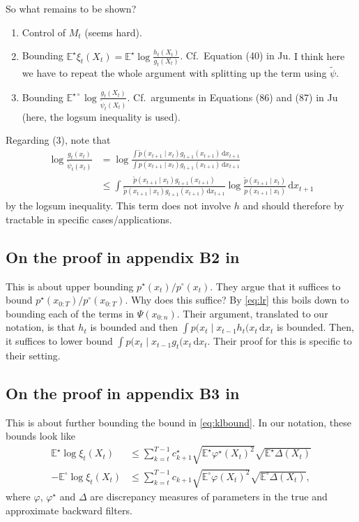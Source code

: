 \documentclass[11pt,reqno]{amsart}
\newcommand{\dd}{{\,\mathrm d}}
\renewcommand{\phi}{\varphi}
\newcommand{\EE}{\mathbb{E}}
\theoremstyle{definition}
\newcommand{\note}[1]{{\color{Red} #1}}
\begin{document}
So what remains to be shown?
\begin{enumerate}
	\item Control of $M_t$ (seems hard).
	\item Bounding $\EE^\star \xi_t(X_t) = \EE^\star \log \frac{h_t(X_t)}{g_t(X_t)}$. Cf.\ Equation (40) in Ju. \note{I think here we have to repeat the whole argument with splitting up the term using $\tilde\psi$.}
	\item Bounding $\EE^{\star\circ} \log \frac{g_t(X_t)}{\tilde\psi_t(X_t)}$. Cf.\ arguments in Equations (86) and (87) in Ju (here, the logsum inequality is used).
\end{enumerate}

Regarding (3), note that
\begin{align*}
	\log \frac{g_t(x_t)}{\tilde\psi_t(x_t)} & = \log \frac{\int \tilde p(x_{t+1}\mid x_t) g_{t+1}(x_{t+1}) \dd x_{t+1}}{\int p(x_{t+1}\mid x_t) g_{t+1}(x_{t+1}) \dd x_{t+1}}\\  & \le \int \frac{\tilde p(x_{t+1}\mid x_t) g_{t+1}(x_{t+1})}{\tilde p(x_{t+1}\mid x_t) g_{t+1}(x_{t+1}) \dd x_{t+1}} \log \frac{\tilde p(x_{t+1}\mid x_t)}{p(x_{t+1}\mid x_t)} \dd x_{t+1}
\end{align*}
by the logsum inequality. This term does not involve $h$ and should therefore by tractable in specific cases/applications. 

\subsection{On the proof in appendix B2 in \cite{ju2021sequential}}

This is about upper bounding $p^\star(x_t)/p^\circ(x_t)$. They argue that it suffices to bound $p^\star(x_{0:T})/p^\circ(x_{0:T})$. \note{Why does this suffice?} 
By \eqref{eq:lr} this boils down to bounding each of the terms in $\Psi(x_{0:n})$. Their argument, translated to our notation, is that $h_t$ is bounded and then 
$\int p(x_t \mid x_{t-1} h_t(x_t \dd x_t$ is bounded. Then, it suffices to lower bound $\int p(x_t \mid x_{t-1} g_t(x_t \dd x_t$. Their proof for this is specific to their setting.  

\subsection{On the proof in appendix B3 in \cite{ju2021sequential}}
This is about further bounding the bound in \eqref{eq:klbound}. In our notation, these bounds look like
\begin{align*}
	\EE^\star \log \xi_t(X_t) &\le \sum_{k=t}^{T-1} c^\star_{k+1} \sqrt{\EE^\star \phi^\star(X_t)^2} \sqrt{\EE^\star \Delta(X_t)} \\ -\EE^\circ \log \xi_t(X_t) &\le \sum_{k=t}^{T-1} c_{k+1} \sqrt{\EE^\circ\phi(X_t)^2} \sqrt{\EE^\circ \Delta(X_t)},
\end{align*}
where $\phi$, $\phi^\star$ and $\Delta$ are discrepancy measures of parameters in the true and approximate backward filters. 
\end{document}
